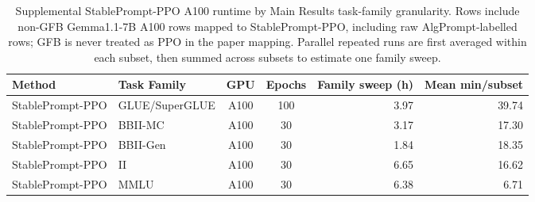 \begin{table}[htbp]
\centering
\caption{Supplemental StablePrompt-PPO A100 runtime by Main Results task-family granularity. Rows include non-GFB Gemma1.1-7B A100 rows mapped to StablePrompt-PPO, including raw AlgPrompt-labelled rows; GFB is never treated as PPO in the paper mapping. Parallel repeated runs are first averaged within each subset, then summed across subsets to estimate one family sweep.}
\label{tab:app_phase1_ppo_runtime}
\begin{tabular}{@{}llccrr@{}}
\toprule
\textbf{Method} & \textbf{Task Family} & \textbf{GPU} & \textbf{Epochs} & \textbf{Family sweep (h)} & \textbf{Mean min/subset} \\ \midrule
StablePrompt-PPO & GLUE/SuperGLUE & A100 & 100 & 3.97 & 39.74 \\
StablePrompt-PPO & BBII-MC & A100 & 30 & 3.17 & 17.30 \\
StablePrompt-PPO & BBII-Gen & A100 & 30 & 1.84 & 18.35 \\
StablePrompt-PPO & II & A100 & 30 & 6.65 & 16.62 \\
StablePrompt-PPO & MMLU & A100 & 30 & 6.38 & 6.71 \\
\bottomrule
\end{tabular}
\end{table}
